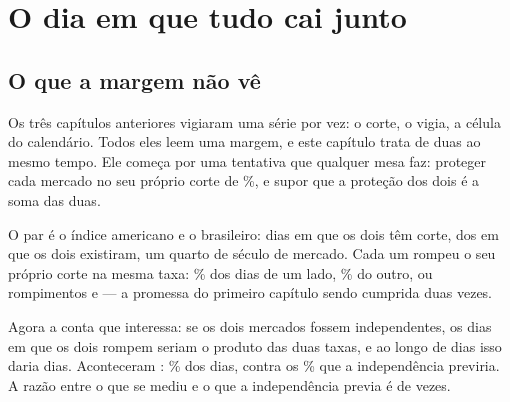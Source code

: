 %
%
%

\chapter{O dia em que tudo cai junto}
\label{cap:dependencia}

\section{O que a margem não vê}

Os três capítulos anteriores vigiaram uma série por vez: o corte, o vigia, a célula do
calendário. Todos eles leem uma margem, e este capítulo trata de duas ao mesmo tempo. Ele começa por uma
tentativa que qualquer mesa faz: proteger cada mercado no seu próprio corte de
\numPromessaPct\%, e supor que a proteção dos dois é a soma das duas.

O par é o índice americano e o brasileiro: \numDependenciaDias{} dias em que os dois têm
corte, dos \numPedacoDiasComuns{} em que os dois existiram, um quarto de século de mercado. Cada um rompeu o seu próprio corte na mesma taxa: \numDependenciaTaxaAPct\% dos dias de um
lado, \numDependenciaTaxaBPct\% do outro, ou \numDependenciaRompeA{} rompimentos e
\numDependenciaRompeB{} --- a promessa do primeiro capítulo sendo cumprida duas vezes.

Agora a conta que interessa: se os dois mercados fossem independentes, os dias em que os dois
rompem seriam o produto das duas taxas, e ao longo de \numDependenciaDias{} dias isso daria
\numDependenciaEsperadoDias{} dias. Aconteceram \numDependenciaJuntos: \numDependenciaJuntosPct\%
dos dias, contra os \numDependenciaEsperadoPct\% que a independência previria. A razão entre o que se mediu e o que a independência previa é de \numDependenciaExcesso{} vezes.

